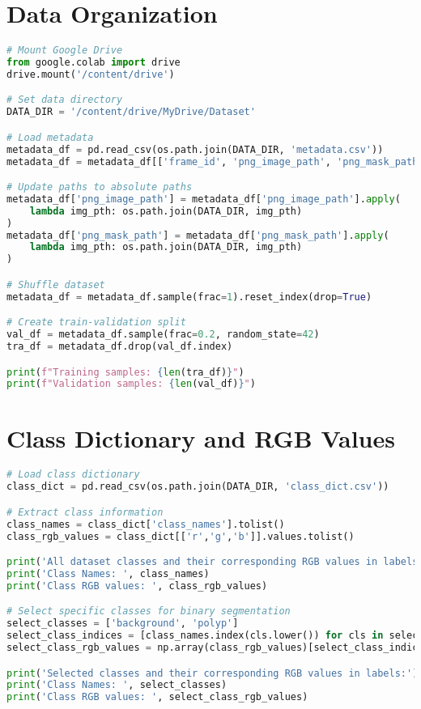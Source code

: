 \documentclass[12pt,a4paper]{report}
\begin{document}
\section{Data Organization}
\begin{lstlisting}[language=Python, caption=Dataset Loading and Organization]
# Mount Google Drive
from google.colab import drive
drive.mount('/content/drive')

# Set data directory
DATA_DIR = '/content/drive/MyDrive/Dataset'

# Load metadata
metadata_df = pd.read_csv(os.path.join(DATA_DIR, 'metadata.csv'))
metadata_df = metadata_df[['frame_id', 'png_image_path', 'png_mask_path']]

# Update paths to absolute paths
metadata_df['png_image_path'] = metadata_df['png_image_path'].apply(
    lambda img_pth: os.path.join(DATA_DIR, img_pth)
)
metadata_df['png_mask_path'] = metadata_df['png_mask_path'].apply(
    lambda img_pth: os.path.join(DATA_DIR, img_pth)
)

# Shuffle dataset
metadata_df = metadata_df.sample(frac=1).reset_index(drop=True)

# Create train-validation split
val_df = metadata_df.sample(frac=0.2, random_state=42)
tra_df = metadata_df.drop(val_df.index)

print(f"Training samples: {len(tra_df)}")
print(f"Validation samples: {len(val_df)}")
\end{lstlisting}

\section{Class Dictionary and RGB Values}
\begin{lstlisting}[language=Python, caption=Class Configuration]
# Load class dictionary
class_dict = pd.read_csv(os.path.join(DATA_DIR, 'class_dict.csv'))

# Extract class information
class_names = class_dict['class_names'].tolist()
class_rgb_values = class_dict[['r','g','b']].values.tolist()

print('All dataset classes and their corresponding RGB values in labels:')
print('Class Names: ', class_names)
print('Class RGB values: ', class_rgb_values)

# Select specific classes for binary segmentation
select_classes = ['background', 'polyp']
select_class_indices = [class_names.index(cls.lower()) for cls in select_classes]
select_class_rgb_values = np.array(class_rgb_values)[select_class_indices]

print('Selected classes and their corresponding RGB values in labels:')
print('Class Names: ', select_classes)
print('Class RGB values: ', select_class_rgb_values)
\end{lstlisting}
\end{document}
